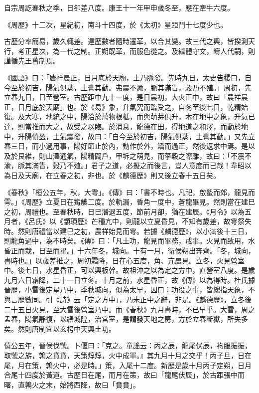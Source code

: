 \begin{pinyinscope}
 自宗周訖春秋之季，日卻差八度。康王十一年甲申歲冬至，應在牽牛六度。



 《周歷》十二次，星紀初，南斗十四度，於《太初》星距鬥十七度少也。



 古歷分率簡易，歲久輒差。達歷數者隨時遷革，以合其變。故三代之興，皆揆測天行，考正星次，為一代之制。正朔既革，而服色從之。及繼體守文，疇人代嗣，則謹循先王舊制焉。



 《國語》曰：「農祥晨正，日月底於天廟，土乃脈發。先時九日，太史告稷曰，自今至於初吉，陽氣俱蒸，土膏其動。弗震不渝，脈其滿眚，穀乃不殖。」周初，先立春九日，日至營室。古歷距中九十一度，是日晨初，大火正中，故曰「農祥晨正，日月底於天廟」也。於《易》象，升氣究而臨受之，自冬至後七日，乾精始復。及大寒，地統之中，陽洽於萬物根柢，而與萌芽俱升，木在地中之象，升氣已達，則當推而大之，故受之以臨。於消息，龍德在田，得地道之和澤，而動於地中，升陽憤盈，土氣震發，故曰：「自今至於初吉，陽氣俱蒸，土膏其動。」又先立春三日，而小過用事，陽好節止於內，動作於外，矯而過正，然後返求中焉。是以及於艮維，則山澤通氣，陽精闢戶，甲坼之萌見，而莩穀之際離，故曰：「不震不渝，脈其滿眚，穀乃不殖。」君子之道，必擬之而後言，豈人意度而已哉！韋昭以為日及天廟，在立春之初，非也。於《麟德歷》則又後立春十五日矣。



 《春秋》「桓公五年，秋，大雩」。《傳》曰：「書不時也。凡祀，啟蟄而郊，龍見而雩。」《周歷》立夏日在觜觿二度。於軌漏，昏角一度中，蒼龍畢見。然則當在建巳之初，周禮也。至春秋時，日已潛退五度，節前月卻，猶在建辰。《月令》以為五月者，《呂氏》以《顓頊歷》芒種亢中，則龍以立夏昏見，不知有歲差，故雩祭失時。然則唐禮當以建巳之初，農祥始見而雩。若據《麟德歷》，以小滿後十三日，則龍角過中，為不時矣。《傳》曰：「凡土功，龍見而畢務，戒事。火見而致用，水昏正而栽，日至而畢。」十六年冬，城向。十有一月，衛侯朔出奔齊。「冬，城向，書時也。」以歲差推之，周初霜降，日在心五度，角、亢晨見。立冬，火見營室中。後七日，水星昏正，可以興板幹。故祖沖之以為定之方中，直營室八度。是歲九月六日霜降，二十一日立冬。十月之前，水星昏正，故《傳》以為得時。杜氏據晉歷，小雪後定星乃中，季秋城向，似為太早，因曰：功役之事，皆總指天象，不與言歷數同。引《詩》云「定之方中」，乃未正中之辭，非是。《麟德歷》，立冬後二十五日火見，至大雪後營室乃中。而《春秋》九月書時，不已早乎。大雪，周之孟春，陽氣靜復，以繕城隍，治宮室，是謂發天地之房，方於立春斷獄，所失多矣。然則唐制宜以玄枵中天興土功。



 僖公五年，晉侯伐虢。卜偃曰：「克之。童謠云：丙之辰，龍尾伏辰，袀服振振，取虢之旂，鶉之賁賁，天策焞焞，火中成軍。』其九月十月之交乎！丙子旦，日在尾，月在策，鶉火中，必是時。」策，入尾十二度。新歷是歲十月丙子定朔，日月合尾十四度於黃道。古歷日在尾，而月在策，故曰「龍尾伏辰」，於古距張中而曙，直鶉火之末，始將西降，故曰「賁賁」。




\end{pinyinscope}
